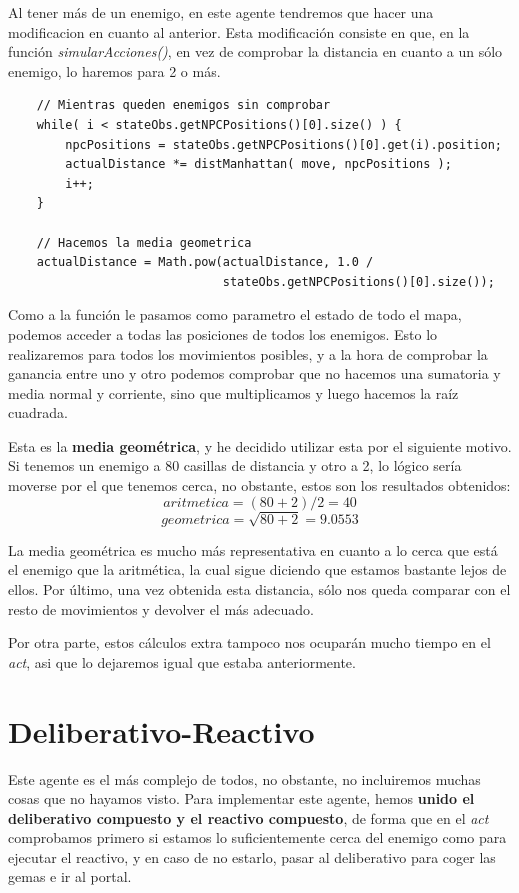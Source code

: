 \documentclass[11pt,a4paper]{article}
\begin{document}
Al tener más de un enemigo, en este agente tendremos que hacer una modificacion en cuanto al anterior. Esta
modificación consiste en que, en la función \textit{simularAcciones()}, en vez de comprobar la distancia en
cuanto a un sólo enemigo, lo haremos para 2 o más.
\newline
\begin{lstlisting}
    // Mientras queden enemigos sin comprobar
    while( i < stateObs.getNPCPositions()[0].size() ) {
        npcPositions = stateObs.getNPCPositions()[0].get(i).position;
        actualDistance *= distManhattan( move, npcPositions );
        i++;
    } 

    // Hacemos la media geometrica
    actualDistance = Math.pow(actualDistance, 1.0 / 
                              stateObs.getNPCPositions()[0].size()); 
\end{lstlisting}


Como a la función le pasamos como parametro el estado de todo el mapa, podemos acceder a todas las posiciones
de todos los enemigos. Esto lo realizaremos para todos los movimientos posibles, y a la hora de comprobar la
ganancia entre uno y otro podemos comprobar que no hacemos una sumatoria y media normal y corriente, sino que
multiplicamos y luego hacemos la raíz cuadrada.

Esta es la \textbf{media geométrica}, y he decidido utilizar esta por el siguiente motivo. Si tenemos un enemigo
a 80 casillas de distancia y otro a 2, lo lógico sería moverse por el que tenemos cerca, no obstante, estos son
los resultados obtenidos:
$$aritmetica = (80+2)/2 = 40$$
$$geometrica = \sqrt{80+2} = 9.0553$$

La media geométrica es mucho más representativa en cuanto a lo cerca que está el enemigo que la aritmética, la
cual sigue diciendo que estamos bastante lejos de ellos. Por último, una vez obtenida esta distancia, sólo nos
queda comparar con el resto de movimientos y devolver el más adecuado.

Por otra parte, estos cálculos extra tampoco nos ocuparán mucho tiempo en el \textit{act}, asi que lo dejaremos
igual que estaba anteriormente.


\newpage

\section{Deliberativo-Reactivo}

Este agente es el más complejo de todos, no obstante, no incluiremos muchas cosas que no hayamos visto. Para
implementar este agente, hemos \textbf{unido el deliberativo compuesto y el reactivo compuesto}, de forma que en
el \textit{act} comprobamos primero si estamos lo suficientemente cerca del enemigo como para ejecutar el reactivo,
y en caso de no estarlo, pasar al deliberativo para coger las gemas e ir al portal.
\end{document}
